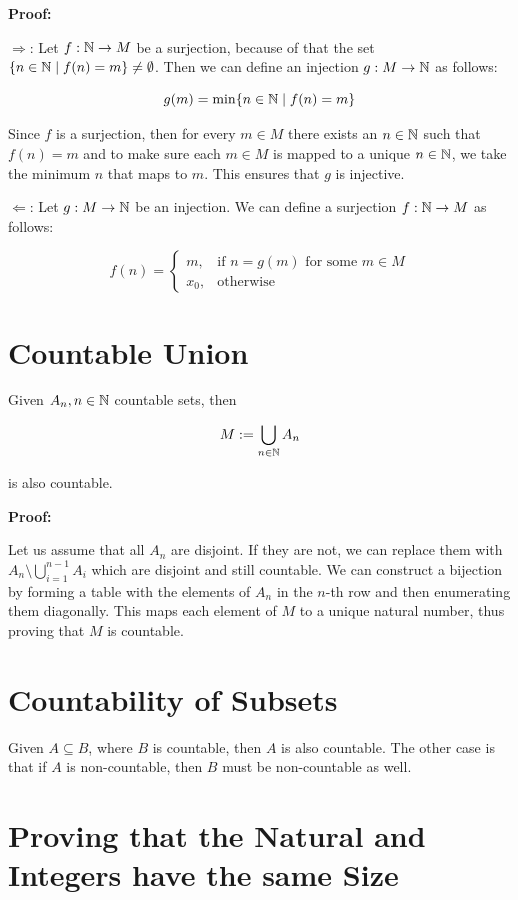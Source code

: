 \textbf{Proof:}

\(\Rightarrow\): Let \(f: \mathbb{N} \to M\) be a surjection, because of that the set \(\{n \in \mathbb{N} \mid f(n) = m\} \neq \emptyset\).
Then we can define an injection  \(g: M \to \mathbb{N}\) as follows:

\[
	g(m) = \min \{ n \in \mathbb{N} \mid f(n) = m \}
\]

Since \(f\) is a surjection, then for every \(m \in M\) there exists an \(n \in \mathbb{N}\) such that \(f(n) = m\) and
to make sure each \( m \in M \) is mapped to a unique \( n \in \mathbb{N} \), we take the minimum \( n \) that maps to \( m \).
This ensures that \( g \) is injective.

\(\Leftarrow\): Let \(g: M \to \mathbb{N}\) be an injection. We can define a surjection \(f: \mathbb{N} \to M\) as follows:

\[
	f(n) = \begin{cases}
		m,    & \text{if } n = g(m) \text{ for some } m \in M \\
		x_0 , & \text{otherwise}
	\end{cases}
\]

\section{Countable Union}

Given \(A_n, n \in \mathbb{N}\) countable sets, then

\[
	M := \bigcup_{n \in \mathbb{N}} A_n
\]

is also countable.

\textbf{Proof:}

Let us assume that all \(A_n\) are disjoint. If they are not, we can replace them with \(A_n \setminus \bigcup_{i = 1}^{n - 1} A_i\) which are disjoint and still countable.
We can construct a bijection by forming a table with the elements of \(A_n\) in the \(n\)-th row and then enumerating them diagonally. This maps each element of \(M\) to a unique natural number, thus proving that \(M\) is countable.

\QED

\section{Countability of Subsets}

Given \(A \subseteq B\), where \(B\) is countable, then \(A\) is also countable. The other case is
that if \(A\) is non-countable, then \(B\) must be non-countable as well.

\section{Proving that the Natural and Integers have the same Size}

